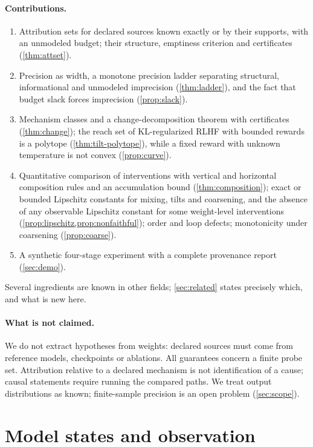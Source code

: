 \documentclass[11pt]{article}
\theoremstyle{definition}
\theoremstyle{remark}
\begin{document}
\paragraph{Contributions.}
\begin{enumerate}[leftmargin=*]
\item Attribution sets for declared sources known exactly or by their supports, with an unmodeled
  budget; their structure, emptiness criterion and certificates (\cref{thm:attset}).
\item Precision as width, a monotone precision ladder separating structural, informational and
  unmodeled imprecision (\cref{thm:ladder}), and the fact that budget slack forces imprecision
  (\cref{prop:slack}).
\item Mechanism classes and a change-decomposition theorem with certificates (\cref{thm:change}); the
  reach set of KL-regularized RLHF with bounded rewards is a polytope (\cref{thm:tilt-polytope}),
  while a fixed reward with unknown temperature is not convex (\cref{prop:curve}).
\item Quantitative comparison of interventions with vertical and horizontal composition rules and an
  accumulation bound (\cref{thm:composition}); exact or bounded Lipschitz constants for mixing, tilts
  and coarsening, and the absence of any observable Lipschitz constant for some weight-level
  interventions (\cref{prop:lipschitz,prop:nonfaithful}); order and loop defects; monotonicity under
  coarsening (\cref{prop:coarse}).
\item A synthetic four-stage experiment with a complete provenance report (\cref{sec:demo}).
\end{enumerate}
Several ingredients are known in other fields; \cref{sec:related} states precisely which, and what is
new here.

\paragraph{What is not claimed.} We do not extract hypotheses from weights: declared sources must
come from reference models, checkpoints or ablations. All guarantees concern a finite probe set.
Attribution relative to a declared mechanism is not identification of a cause; causal statements
require running the compared paths. We treat output distributions as known; finite-sample precision
is an open problem (\cref{sec:scope}).

\section{Model states and observation}\label{sec:states}
\end{document}
